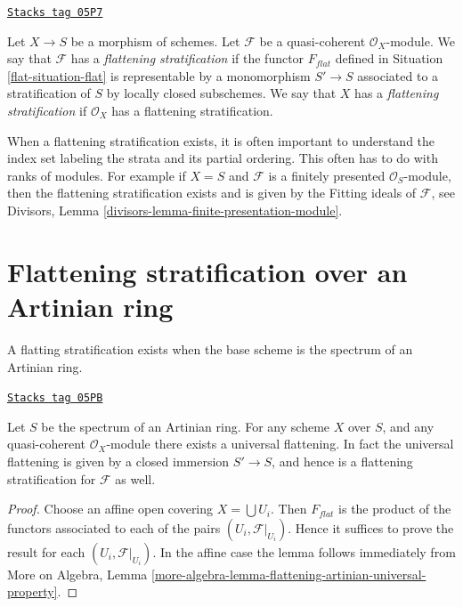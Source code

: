 \begin{definition}
\label{flat-definition-flattening-stratification}
\href{https://stacks.math.columbia.edu/tag/05P7}{\texttt{Stacks tag 05P7}}

Let $X \to S$ be a morphism of schemes.
Let $\mathcal{F}$ be a quasi-coherent $\mathcal{O}_X$-module.
We say that $\mathcal{F}$ has a {\it flattening stratification}
if the functor $F_{flat}$ defined in Situation \ref{flat-situation-flat}
is representable by a monomorphism $S' \to S$ associated
to a stratification of $S$ by locally closed subschemes.
We say that $X$ has a {\it flattening stratification}
if $\mathcal{O}_X$ has a flattening stratification.
\end{definition}

When a flattening stratification exists, it is often important
to understand the index set labeling the strata and its partial ordering.
This often has to do with ranks of modules. For example if
$X = S$ and $\mathcal{F}$ is a finitely presented $\mathcal{O}_S$-module,
then the flattening stratification exists and is given by the Fitting ideals
of $\mathcal{F}$, see
Divisors, Lemma \ref{divisors-lemma-finite-presentation-module}.

\section{Flattening stratification over an Artinian ring}
\label{flat-section-flattening-artinian}
A flatting stratification exists when the base scheme is the spectrum
of an Artinian ring.

\begin{lemma}
\label{flat-lemma-flattening-stratification-artinian}
\href{https://stacks.math.columbia.edu/tag/05PB}{\texttt{Stacks tag 05PB}}

Let $S$ be the spectrum of an Artinian ring.
For any scheme $X$ over $S$, and any quasi-coherent $\mathcal{O}_X$-module
there exists a universal flattening. In fact the universal flattening
is given by a closed immersion $S' \to S$, and hence is a flattening
stratification for $\mathcal{F}$ as well.
\end{lemma}

\begin{proof}
Choose an affine open covering $X = \bigcup U_i$.
Then $F_{flat}$ is the product of the functors associated to
each of the pairs $(U_i, \mathcal{F}|_{U_i})$.
Hence it suffices to prove the result for each
$(U_i, \mathcal{F}|_{U_i})$.
In the affine case the lemma follows immediately from
More on Algebra,
Lemma \ref{more-algebra-lemma-flattening-artinian-universal-property}.
\end{proof}

